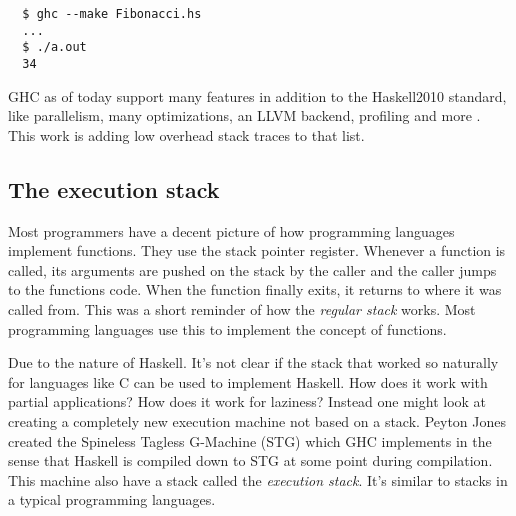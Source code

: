 \begin{verbatim}
  $ ghc --make Fibonacci.hs
  ...
  $ ./a.out
  34
\end{verbatim}

GHC as of today support many features in addition to the Haskell2010
standard, like parallelism, many optimizations, an LLVM backend, profiling
and more \cite{ghc_website}. This
work is adding low overhead stack traces to that list.

\subsection{The execution stack}

Most programmers have a decent picture of how programming languages implement
functions. They use the stack pointer register. Whenever a function is called, its
arguments are pushed on the stack by the caller and the caller jumps to the
functions code. When the function finally exits, it returns to where it was
called from. This was a short reminder of how the \emph{regular stack} works.
Most programming languages use this to implement the concept of functions.

Due to the nature of Haskell. It's not clear if the stack that
worked so naturally for languages like C can be used to implement
Haskell. How does it work with partial applications? How does it
work for laziness? Instead one might look at creating a completely
new execution machine not based on a stack. Peyton Jones created the
Spineless Tagless G-Machine (STG) \cite{stg_1992} which GHC implements
\cite{evalapplyjfp06} in the sense that Haskell is compiled down to
STG at some point during compilation. This machine also have a stack
called the \emph{execution stack}. It's similar to stacks in a typical
programming languages.


